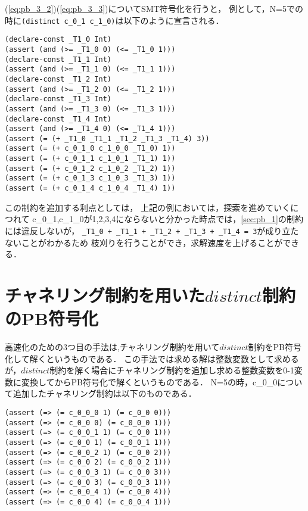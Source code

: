 (\ref{eq:pb_3_2})(\ref{eq:pb_3_3})についてSMT符号化を行うと，
例として，N=5での時に\verb|(distinct c_0_1 c_1_0)|は以下のように宣言される．

\begin{verbatim}
(declare-const _T1_0 Int)
(assert (and (>= _T1_0 0) (<= _T1_0 1)))
(declare-const _T1_1 Int)
(assert (and (>= _T1_1 0) (<= _T1_1 1)))
(declare-const _T1_2 Int)
(assert (and (>= _T1_2 0) (<= _T1_2 1)))
(declare-const _T1_3 Int)
(assert (and (>= _T1_3 0) (<= _T1_3 1)))
(declare-const _T1_4 Int)
(assert (and (>= _T1_4 0) (<= _T1_4 1)))
(assert (= (+ _T1_0 _T1_1 _T1_2 _T1_3 _T1_4) 3))
(assert (= (+ c_0_1_0 c_1_0_0 _T1_0) 1))
(assert (= (+ c_0_1_1 c_1_0_1 _T1_1) 1))
(assert (= (+ c_0_1_2 c_1_0_2 _T1_2) 1))
(assert (= (+ c_0_1_3 c_1_0_3 _T1_3) 1))
(assert (= (+ c_0_1_4 c_1_0_4 _T1_4) 1))
\end{verbatim}

この制約を追加する利点としては，
上記の例においては，探索を進めていくにつれて
c\_0\_1,c\_1\_0が1,2,3,4にならないと分かった時点では，\ref{sec:pb_1}の制約には違反しないが，
\verb|_T1_0 + _T1_1 + _T1_2 + _T1_3 + _T1_4 = 3|が成り立たないことがわかるため
枝刈りを行うことができ，求解速度を上げることができる．



%
%
\section{チャネリング制約を用いた$distinct$制約のPB符号化}\label{sec:pb_c}
高速化のための3つ目の手法は,チャネリング制約を用いて$distinct$制約をPB符号化して解くというものである．
この手法では求める解は整数変数として求めるが，$distinct$制約を解く場合にチャネリング制約を追加し求める整数変数を0-1変数に変換してからPB符号化で解くというものである．
N=5の時，c\_0\_0について追加したチャネリング制約は以下のものである．
\begin{verbatim}
(assert (=> (= c_0_0_0 1) (= c_0_0 0)))
(assert (=> (= c_0_0 0) (= c_0_0_0 1)))
(assert (=> (= c_0_0_1 1) (= c_0_0 1)))
(assert (=> (= c_0_0 1) (= c_0_0_1 1)))
(assert (=> (= c_0_0_2 1) (= c_0_0 2)))
(assert (=> (= c_0_0 2) (= c_0_0_2 1)))
(assert (=> (= c_0_0_3 1) (= c_0_0 3)))
(assert (=> (= c_0_0 3) (= c_0_0_3 1)))
(assert (=> (= c_0_0_4 1) (= c_0_0 4)))
(assert (=> (= c_0_0 4) (= c_0_0_4 1)))
\end{verbatim}




